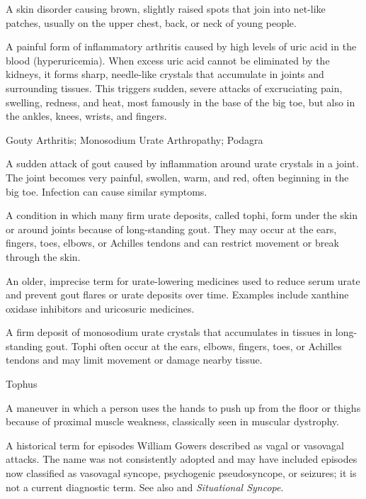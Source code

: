  A skin disorder causing brown, slightly raised spots that join into net-like patches, usually on the upper chest, back, or neck of young people.

 A painful form of inflammatory arthritis caused by high levels of uric acid in the blood (hyperuricemia). When excess uric acid cannot be eliminated by the kidneys, it forms sharp, needle-like crystals that accumulate in joints and surrounding tissues. This triggers sudden, severe attacks of excruciating pain, swelling, redness, and heat, most famously in the base of the big toe, but also in the ankles, knees, wrists, and fingers.

\synonyms
Gouty Arthritis; Monosodium Urate Arthropathy; Podagra

 A sudden attack of gout caused by inflammation around urate crystals in a joint. The joint becomes very painful, swollen, warm, and red, often beginning in the big toe. Infection can cause similar symptoms.

 A condition in which many firm urate deposits, called tophi, form under the skin or around joints because of long-standing gout. They may occur at the ears, fingers, toes, elbows, or Achilles tendons and can restrict movement or break through the skin.

 An older, imprecise term for urate-lowering medicines used to reduce serum urate and prevent gout flares or urate deposits over time. Examples include xanthine oxidase inhibitors and uricosuric medicines.

 A firm deposit of monosodium urate crystals that accumulates in tissues in long-standing gout. Tophi often occur at the ears, elbows, fingers, toes, or Achilles tendons and may limit movement or damage nearby tissue.

\synonyms
Tophus

 A maneuver in which a person uses the hands to push up from the floor or thighs because of proximal muscle weakness, classically seen in muscular dystrophy.

 A historical term for episodes William Gowers described as vagal or vasovagal attacks. The name was not consistently adopted and may have included episodes now classified as vasovagal syncope, psychogenic pseudosyncope, or seizures; it is not a current diagnostic term. See also  and \textit{Situational Syncope}.

